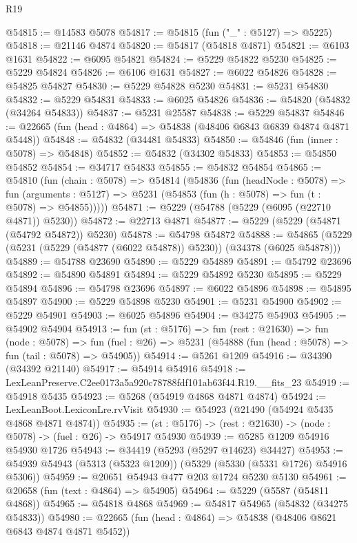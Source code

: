 \begin{lexlean}{R19}
\begin{coremodule}
@54815 := @14583 @5078
@54817 := @54815 (fun ("_" : @5127) => @5225)
@54818 := @21146 @4874
@54820 := @54817 (@54818 @4871)
@54821 := @6103 @1631
@54822 := @6095 @54821
@54824 := @5229 @54822 @5230
@54825 := @5229 @54824
@54826 := @6106 @1631
@54827 := @6022 @54826
@54828 := @54825 @54827
@54830 := @5229 @54828 @5230
@54831 := @5231 @54830
@54832 := @5229 @54831
@54833 := @6025 @54826
@54836 := @54820 (@54832 (@34264 @54833))
@54837 := @5231 @25587
@54838 := @5229 @54837
@54846 := @22665 (fun (head : @4864) => @54838 (@48406 @6843 @6839 @4874 @4871 @5448))
@54848 := @54832 (@34481 @54833)
@54850 := @54846 (fun (inner : @5078) => @54848)
@54852 := @54832 (@34302 @54833)
@54853 := @54850 @54852
@54854 := @34717 @54833
@54855 := @54832 @54854
@54865 := @54810
    (fun (chain : @5078) =>
    @54814
      (@54836
        (fun (headNode : @5078) =>
        fun (arguments : @5127) => @5231 (@54853 (fun (h : @5078) => fun (t : @5078) => @54855)))))
@54871 := @5229 (@54788 (@5229 (@6095 (@22710 @4871)) @5230))
@54872 := @22713 @4871
@54877 := @5229 (@5229 (@54871 (@54792 @54872)) @5230)
@54878 := @54798 @54872
@54888 := @54865 (@5229 (@5231 (@5229 (@54877 (@6022 @54878)) @5230)) (@34378 (@6025 @54878)))
@54889 := @54788 @23690
@54890 := @5229 @54889
@54891 := @54792 @23696
@54892 := @54890 @54891
@54894 := @5229 @54892 @5230
@54895 := @5229 @54894
@54896 := @54798 @23696
@54897 := @6022 @54896
@54898 := @54895 @54897
@54900 := @5229 @54898 @5230
@54901 := @5231 @54900
@54902 := @5229 @54901
@54903 := @6025 @54896
@54904 := @34275 @54903
@54905 := @54902 @54904
@54913 := fun (st : @5176) =>
  fun (rest : @21630) =>
  fun (node : @5078) =>
  fun (fuel : @26) => @5231 (@54888 (fun (head : @5078) => fun (tail : @5078) => @54905))
@54914 := @5261 @1209
@54916 := @34390 (@34392 @21140)
@54917 := @54914 @54916
@54918 := LexLeanPreserve.C2ee0173a5a920c78788fdf101ab63f44.R19.__fits_23
@54919 := @54918 @5435
@54923 := @5268 (@54919 @4868 @4871 @4874)
@54924 := LexLeanBoot.LexiconLre.rvVisit
@54930 := @54923 (@21490 (@54924 @5435 @4868 @4871 @4874))
@54935 := (st : @5176) -> (rest : @21630) -> (node : @5078) -> (fuel : @26) -> @54917 @54930
@54939 := @5285 @1209 @54916 @54930 @1726
@54943 := @34419 (@5293 (@5297 @14623) @34427)
@54953 := @54939 @54943 (@5313 (@5323 @1209)) (@5329 (@5330 (@5331 @1726) @54916 @5306))
@54959 := @20651 @54943 @477 @203 @1724 @5230 @5130
@54961 := @20658 (fun (text : @4864) => @54905)
@54964 := @5229 (@5587 (@54811 @4868))
@54965 := @54818 @4868
@54969 := @54817 @54965 (@54832 (@34275 @54833))
@54980 := @22665
    (fun (head : @4864) => @54838 (@48406 @8621 @6843 @4874 @4871 @5452))

\end{coremodule}
\end{lexlean}
